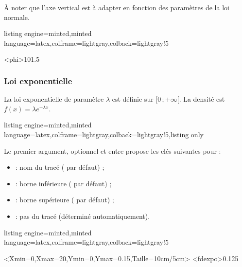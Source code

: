 \documentclass[11pt,a4paper]{ltxdoc}
\begin{document}
À noter que l'axe vertical est à adapter en fonction des paramètres de la loi normale.

\begin{tcblisting}{listing engine=minted,minted language=latex,colframe=lightgray,colback=lightgray!5}
\begin{GraphiqueTikz}%
    [x=1.25cm,y=15cm,Origx=5,Xmin=5,Xmax=15,Ymin=0,Ymax=0.3,
    Ygrille=0.1,Ygrilles=0.05]
  \DefinirLoiNormale[Nom=gaussienne]<phi>{10}{1.5}
\end{GraphiqueTikz}
\end{tcblisting}

\subsubsection{Loi exponentielle}\label{loiexpo}

La loi exponentielle de paramètre $\lambda$ est définie sur $[0\,;+\infty[$. La densité est $f(x) = \lambda e^{-\lambda x}$.

\begin{tcblisting}{listing engine=minted,minted language=latex,colframe=lightgray,colback=lightgray!5,listing only}
\end{tcblisting}

Le premier argument, optionnel et entre \MontreCode{[...]} propose les clés suivantes pour  :

\begin{itemize}
  \item {} : nom du tracé ( par défaut) ;
  \item {} : borne inférieure ( par défaut) ;
  \item {} : borne supérieure ( par défaut) ;
  \item {} : pas du tracé (déterminé automatiquement).
\end{itemize}

\begin{tcblisting}{listing engine=minted,minted language=latex,colframe=lightgray,colback=lightgray!5}
\begin{GraphiqueTikz}%
    [Xgrille=2,Xgrilles=1,Ygrille=0.05,Ygrilles=0.025]%
    <Xmin=0,Xmax=20,Ymin=0,Ymax=0.15,Taille={10cm/5cm}>
  \TracerAxesGrilles[Elargir=2.5mm,Dernier,Derriere]{}{}
  \DefinirLoiExponentielle[]<fdexpo>{0.125}
\end{GraphiqueTikz}
\end{tcblisting}
\end{document}
